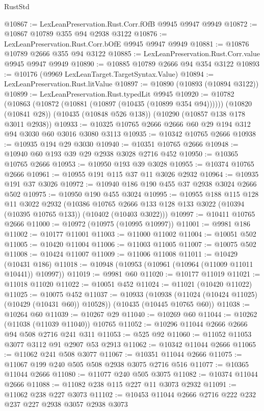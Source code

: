 \begin{lexlean}{RustStd}
\begin{coremodule}
{\begin{coremodule}
{{{{{{{{{{{{{{{{{{{{{{{{{{{{{{{{{{{{{{{{{{{{{{{{{{{{{{{{{{{{{{{{{{{{{{{{{{{{{{@10867 := LexLeanPreservation.Rust.Corr.fOfB @9945 @9947 @9949
@10872 := @10867 @10789 @355 @94 @2938 @3122
@10876 := LexLeanPreservation.Rust.Corr.bOfE @9945 @9947 @9949
@10881 := @10876 @10789 @2666 @355 @94 @3122
@10885 := LexLeanPreservation.Rust.Corr.value @9945 @9947 @9949
@10890 := @10885 @10789 @2666 @94 @354 @3122
@10893 := @10176 (@9969 LexLeanTarget.TargetSyntax.Value)
@10894 := LexLeanPreservation.Rust.litValue
@10897 := @10890 (@10893 (@10894 @3122))
@10899 := LexLeanPreservation.Rust.typedLit @9945
@10920 := @10782
    (@10863 (@10872 (@10881 (@10897 (@10435 (@10899 @354 @94))))))
    (@10820 (@10841 @28))
    (@10435 (@10848 @526 @138))
    (@10290 (@10857 @138 @178 @3011 @2938))
@10933 := @10325 @10765 @2666 @2666 @60 @29 @194 @312 @94 @3030 @60 @3016 @3080 @3113
@10935 := @10342 @10765 @2666
@10938 := @10935 @194 @29 @3030
@10940 := @10351 @10765 @2666
@10948 := @10940 @60 @193 @39 @29 @2938 @3028 @2716 @452
@10950 := @10365 @10765 @2666
@10953 := @10950 @193 @39 @3028
@10955 := @10374 @10765 @2666
@10961 := @10955 @191 @115 @37 @11 @3026 @2932
@10964 := @10935 @191 @37 @3026
@10972 := @10940 @186 @190 @455 @37 @2938 @3024 @2666 @502
@10975 := @10950 @190 @455 @3024
@10995 := @10955
    @188
    @115
    @128
    @11
    @3022
    @2932
    (@10386 @10765 @2666 @133 @128 @133 @3022 (@10394 (@10395 @10765 @133)) (@10402 (@10403 @3022)))
@10997 := @10411 @10765 @2666
@11000 := @10972 (@10975 (@10995 @10997))
@11001 := @9981 @186
@11002 := @10177 @11001
@11003 := @11000 @11002
@11004 := @10051 @502
@11005 := @10420 @11004
@11006 := @11003 @11005
@11007 := @10075 @502
@11008 := @10424 @11007
@11009 := @11006 @11008
@11011 := @10429 (@10431 @186)
@11018 := @10948 (@10953 (@10961 (@10964 (@11009 @11011 @10441)) @10997))
@11019 := @9981 @60
@11020 := @10177 @11019
@11021 := @11018 @11020
@11022 := @10051 @452
@11024 := @11021 (@10420 @11022)
@11025 := @10075 @452
@11037 := @10933
    (@10938 (@11024 (@10424 @11025) (@10429 (@10431 @60)) @10528))
    (@10435 (@10445 @10765 @60))
@11038 := @10264 @60
@11039 := @10267 @29
@11040 := @10269 @60
@11044 := @10262 (@11038 (@11039 @11040)) @10765
@11052 := @10296 @11044 @2666 @2666 @94 @508 @2716 @241 @311
@11053 := @525 @92
@11060 := @11052 @11053 @3077 @3112 @91 @2907 @53 @2913
@11062 := @10342 @11044 @2666
@11065 := @11062 @241 @508 @3077
@11067 := @10351 @11044 @2666
@11075 := @11067 @199 @240 @505 @508 @2938 @3075 @2716 @516
@11077 := @10365 @11044 @2666
@11080 := @11077 @240 @505 @3075
@11082 := @10374 @11044 @2666
@11088 := @11082 @238 @115 @227 @11 @3073 @2932
@11091 := @11062 @238 @227 @3073
@11102 := @10453 @11044 @2666 @2716 @222 @232 @237 @227 @2938 @3057 @2938 @3073
}}}}}}}}}}}}}}}}}}}}}}}}}}}}}}}}}}}}}}}}}}}}}}}}}}}}}}}}}}}}}}}}}}}}}}}}}}}}}}
\end{coremodule}}
\end{coremodule}
\end{lexlean}
